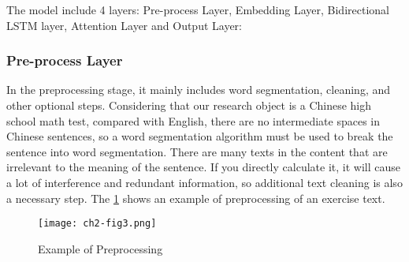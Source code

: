 The model include 4 layers: Pre-process Layer, Embedding Layer, Bidirectional LSTM layer, Attention Layer and Output Layer:
\subsubsection{Pre-process Layer}




In the preprocessing stage, it mainly includes word segmentation, cleaning, and other optional steps. Considering that our research object is a Chinese high school math test, compared with English, there are no intermediate spaces in Chinese sentences, so a word segmentation algorithm must be used to break the sentence into word segmentation. There are many texts in the content that are irrelevant to the meaning of the sentence. If you directly calculate it, it will cause a lot of interference and redundant information, so additional text cleaning is also a necessary step. The \figurename{\ref{ch2-fig3}} shows an example of preprocessing of an exercise text.

\begin{figure}[h]
	\centering
	\texttt{[image: ch2-fig3.png]}
	\caption{Example of Preprocessing}\label{ch2-fig3}
\end{figure}


